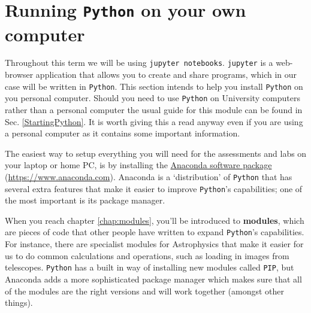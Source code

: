 



\section{Running \texttt{Python} on your own computer}

Throughout this term we will be using \texttt{jupyter notebooks}. \texttt{jupyter} is a web-browser application that allows you to create and share programs, which in our case will be written in \texttt{Python}. This section intends to help you install \texttt{Python} on you personal computer. Should you need to use \texttt{Python} on University computers rather than a personal computer the usual guide for this module can be found in Sec. \ref{StartingPython}. It is worth giving this a read anyway even if you are using a personal computer as it contains some important information.

The easiest way to setup everything you will need for the assessments and labs on your laptop or home PC, is by installing the \href{https://www.anaconda.com}{Anaconda software package} (\url{https://www.anaconda.com}). Anaconda is a `distribution' of \texttt{Python} that has several extra features that make it easier to improve \texttt{Python}'s capabilities; one of the most important is its package manager. 

When you reach chapter \ref{chap:modules}, you'll be introduced to \textbf{modules}, which are pieces of code that other people have written to expand \texttt{Python}'s capabilities. For instance, there are specialist modules for Astrophysics that make it easier for us to do common calculations and operations, such as loading in images from telescopes. \texttt{Python} has a built in way of installing new modules called \texttt{PIP}, but Anaconda adds a more sophisticated package manager which makes sure that all of the modules are the right versions and will work together (amongst other things).

